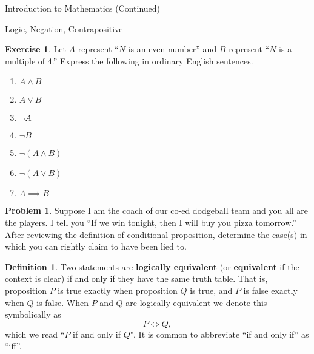 \documentclass[11pt]{article}
\theoremstyle{definition}
\newtheorem{definition}[theorem]{Definition}
\newtheorem{exercise}[theorem]{Exercise}
\newtheorem{problem}[theorem]{Problem}
\begin{document}
\begin{section}{Introduction to Mathematics (Continued)}
\begin{subsection}{Logic, Negation, Contrapositive}




\begin{exercise}\label{exer:translations}
Let $A$ represent ``$N$ is an even number'' and $B$ represent ``$N$ is a multiple of 4.''  Express the following in ordinary English sentences.
\begin{enumerate}
  \item $A \wedge B$
  \item $A \vee B$
  \item $\neg A$
  \item $\neg B$
  \item $\neg (A \wedge B)$
  \item $\neg (A \vee B)$
  \item $A \implies B$
\end{enumerate}
\end{exercise}

\begin{problem}
Suppose I am the coach of our co-ed dodgeball team and you all are the players.  I tell you ``If we win tonight, then I will buy you pizza tomorrow.''  After reviewing the definition of conditional proposition, determine the case(s) in which you can rightly claim to have been lied to.
\end{problem}

\begin{definition}
Two statements are \textbf{logically equivalent} (or \textbf{equivalent} if the context is clear) if and only if they have the same truth table.  That is, proposition $P$ is true exactly when proposition $Q$ is true, and $P$ is false exactly when $Q$ is false.  When $P$ and $Q$ are logically equivalent we denote this symbolically as 
$$
P \Leftrightarrow Q,
$$
which we read ``$P$ if and only if $Q$".  It is common to abbreviate ``if and only if'' as ``iff''.
\end{definition}


\end{subsection}
\end{section}
\end{document}
